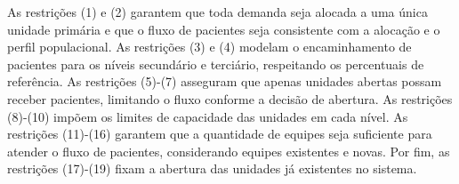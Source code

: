
As restrições (1) e (2) garantem que toda demanda seja alocada a uma única unidade primária e que o fluxo de pacientes seja consistente com a alocação e o perfil populacional. As restrições (3) e (4) modelam o encaminhamento de pacientes para os níveis secundário e terciário, respeitando os percentuais de referência. As restrições (5)-(7) asseguram que apenas unidades abertas possam receber pacientes, limitando o fluxo conforme a decisão de abertura. As restrições (8)-(10) impõem os limites de capacidade das unidades em cada nível. As restrições (11)-(16) garantem que a quantidade de equipes seja suficiente para atender o fluxo de pacientes, considerando equipes existentes e novas. Por fim, as restrições (17)-(19) fixam a abertura das unidades já existentes no sistema. 
